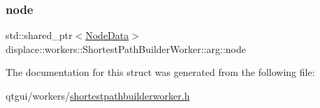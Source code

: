 \mbox{\label{structdisplace_1_1workers_1_1_shortest_path_builder_worker_1_1arg_a387456d9ae2ba572f98493ba5c381b8f}} 
\subsubsection{\texorpdfstring{node}{node}}
{\footnotesize\ttfamily std\+::shared\+\_\+ptr$<$\mbox{\hyperlink{class_node_data}{Node\+Data}}$>$ displace\+::workers\+::\+Shortest\+Path\+Builder\+Worker\+::arg\+::node}



The documentation for this struct was generated from the following file\+:\begin{DoxyCompactItemize}
\item 
qtgui/workers/\mbox{\hyperlink{shortestpathbuilderworker_8h}{shortestpathbuilderworker.\+h}}\end{DoxyCompactItemize}

